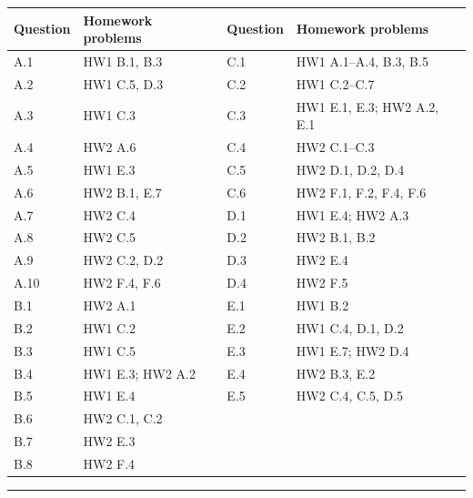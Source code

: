\documentclass[11pt]{article}
\newcounter{prob}[section]
\begin{document}
\begin{center}
\renewcommand{\arraystretch}{1.2}
\small
\begin{tabular}{@{}l l @{\qquad\qquad} l l@{}}
\toprule
\textbf{Question} & \textbf{Homework problems} &
\textbf{Question} & \textbf{Homework problems} \\
\midrule
A.1  & HW1 B.1, B.3       & C.1 & HW1 A.1--A.4, B.3, B.5 \\
A.2  & HW1 C.5, D.3       & C.2 & HW1 C.2--C.7 \\
A.3  & HW1 C.3            & C.3 & HW1 E.1, E.3; HW2 A.2, E.1 \\
A.4  & HW2 A.6            & C.4 & HW2 C.1--C.3 \\
A.5  & HW1 E.3            & C.5 & HW2 D.1, D.2, D.4 \\
A.6  & HW2 B.1, E.7       & C.6 & HW2 F.1, F.2, F.4, F.6 \\
A.7  & HW2 C.4            & D.1 & HW1 E.4; HW2 A.3 \\
A.8  & HW2 C.5            & D.2 & HW2 B.1, B.2 \\
A.9  & HW2 C.2, D.2       & D.3 & HW2 E.4 \\
A.10 & HW2 F.4, F.6       & D.4 & HW2 F.5 \\
\addlinespace
B.1  & HW2 A.1            & E.1 & HW1 B.2 \\
B.2  & HW1 C.2            & E.2 & HW1 C.4, D.1, D.2 \\
B.3  & HW1 C.5            & E.3 & HW1 E.7; HW2 D.4 \\
B.4  & HW1 E.3; HW2 A.2   & E.4 & HW2 B.3, E.2 \\
B.5  & HW1 E.4            & E.5 & HW2 C.4, C.5, D.5 \\
B.6  & HW2 C.1, C.2       &     & \\
B.7  & HW2 E.3            &     & \\
B.8  & HW2 F.4            &     & \\
\bottomrule
\end{tabular}
\end{center}

\vfill
\noindent\rule{\textwidth}{0.4pt}

\smallskip
{}
\end{document}
